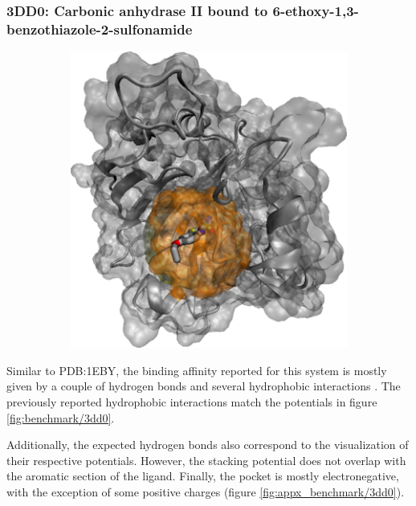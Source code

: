     \subsubsection{3DD0: Carbonic anhydrase II bound to 6-ethoxy-1,3-benzothiazole-2-sulfonamide}
      \begin{figure}[H] \centering
        \begin{subfigure}[c]{0.3\textwidth} \centering
          \includegraphics[width=1\textwidth]{figures/results/ps_prot/3dd0.png}
        \end{subfigure}
        \begin{subfigure}[c]{0.3\textwidth} \centering
        \end{subfigure}
      \end{figure}

      Similar to PDB:1EBY, the binding affinity reported for this system is mostly given by a couple of hydrogen bonds and several hydrophobic interactions \cite{benchmark_strong_2021}. The previously reported hydrophobic interactions match the potentials in figure \ref{fig:benchmark/3dd0}.

      Additionally, the expected hydrogen bonds also correspond to the visualization of their respective potentials. However, the stacking potential does not overlap with the aromatic section of the ligand. Finally, the pocket is mostly electronegative, with the exception of some positive charges (figure \ref{fig:appx_benchmark/3dd0}).

